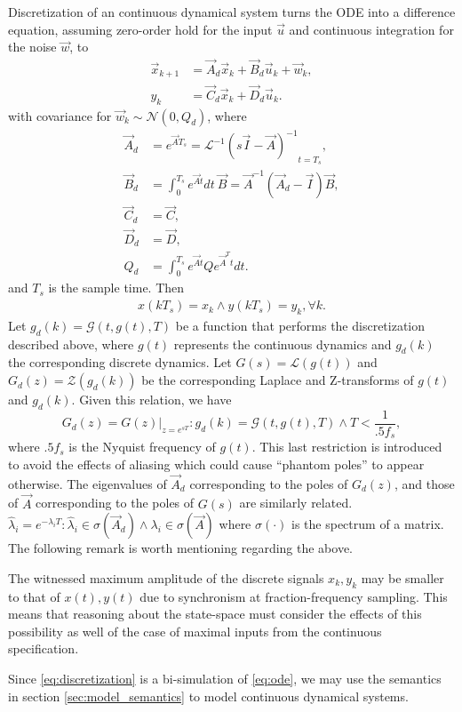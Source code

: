 \documentclass[runningheads,a4paper]{llncs}
\begin{document}
Discretization of an continuous dynamical system turns the ODE into a difference equation, assuming zero-order hold
for the input $\vec{u}$ and continuous integration for the noise $\vec{w}$, to
\begin{align}
\label{eq:discretization}
\vec{x}_{k+1} &= \vec{A}_d\vec{x}_k+\vec{B}_d\vec{u}_k + \vec{w}_k,\\
y_k &= \vec{C}_d \vec{x}_ k + \vec{D}_d \vec{u}_ k. 
\end{align}
with covariance for $\vec{w}_k \sim \mathcal{N}(0,Q_d)$,
where
\begin{align}
\label{eq:discretize}
\vec{A}_d &= e^{\vec{A} T_s} = \mathcal{L}^{-1} { ( s \vec{I} - \vec{A} )^{-1} }_{t = T_s},\\
\vec{B}_d &= \int_{0}^{T_s} e^{\vec{A} t} dt\ \vec{B} = \vec{A}^{-1} ( \vec{A}_d - \vec{I} ) \vec{B},\\
\vec{C}_d &= \vec{C},\\
\vec{D}_d &= \vec{D},\\
Q_d &= \int_{0}^{T_s} e^{\vec{A} t} Q e^{\vec{A}^T t} dt.
\end{align}
and $T_s$ is the sample time. Then
\begin{align*}
x(kT_s)=x_k \wedge y(kT_s) = y_k, \forall k.
\end{align*}
Let $g_d(k)=\mathcal{G}(t,g(t),T)$ be a function that performs the discretization described above, where $g(t)$
represents the continuous dynamics and $g_d(k)$ the corresponding discrete dynamics. 
Let $G(s)=\mathcal{L}(g(t))$ and $G_d(z)=\mathcal{Z}(g_d(k))$ be the corresponding Laplace and Z-transforms
of $g(t)$ and $g_d(k)$. Given this relation, we have 
$$G_d(z)=G(z)|_{z=e^{sT}} : g_d(k)=\mathcal{G}(t,g(t),T) \wedge T < \frac{1}{.5f_s},$$
where $.5f_s$ is the Nyquist frequency of $g(t)$. This last restriction is introduced to avoid the effects of aliasing
which could cause ``phantom poles'' to appear otherwise. 
The eigenvalues of $\vec{A}_d$ corresponding to the poles of $G_d(z)$, and those of $\vec{A}$ corresponding to the poles of $G(s)$ are similarly related.
$\hat{\lambda}_i=e^{-\lambda_iT} : \hat{\lambda}_i \in \sigma(\vec{A}_d) \wedge \lambda_i \in \sigma(\vec{A})$
where $\sigma(\cdot)$ is the spectrum of a matrix.
The following remark is worth mentioning regarding the above.
\begin{remark}
The witnessed maximum amplitude of the discrete signals $x_k,y_k$ may be smaller to that of $x(t),y(t)$ due to synchronism at fraction-frequency sampling.
This means that reasoning about the state-space must consider the effects of this possibility as well of the case of maximal inputs from the continuous specification.
\end{remark}
 Since \eqref{eq:discretization} is a bi-simulation of \eqref{eq:ode}, we may use the semantics in section \ref{sec:model_semantics} to model continuous dynamical systems.
\end{document}

